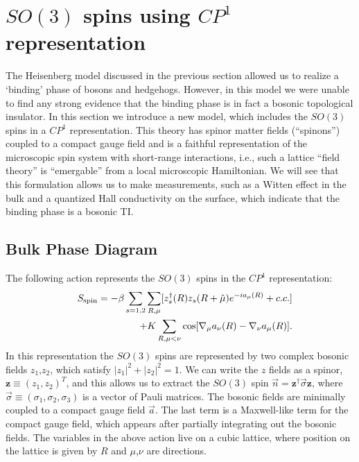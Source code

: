 \documentclass[prb,twocolumn]{revtex4-1}
\newcommand{\cp}{$CP^1$ }
\begin{document}

\section{$SO(3)$ spins using $CP^1$ representation}
\label{section::CP1}

The Heisenberg model discussed in the previous section allowed us to realize a `binding' phase of bosons and hedgehogs. However, in this model we were unable to find any strong evidence that the binding phase is in fact a bosonic topological insulator. In this section we introduce a new model, which includes the $SO(3)$ spins in a \cp representation. 
This theory has spinor matter fields (``spinons'') coupled to a compact gauge field and is a faithful representation of the microscopic spin system with short-range interactions, i.e., such a lattice ``field theory'' is ``emergable'' from a local microscopic Hamiltonian. We will see that this formulation allows us to make measurements, such as a Witten effect in the bulk and a quantized Hall conductivity on the surface, which indicate that the binding phase is a bosonic TI.

\subsection{Bulk Phase Diagram}
The following action represents the $SO(3)$ spins in the $CP^1$ representation:
\begin{eqnarray}
&&S_{\rm spin}=-\beta\sum_{s=1,2}\sum_{R,\mu} [z_s^\dagger(R)z_s(R+\hat\mu)e^{-ia_\mu(R)}+c.c.] \nonumber\\
&&+K\sum_{R,\mu<\nu} \cos[\nabla_\mu a_\nu(R)-\nabla_\nu a_\mu(R)].
\label{cp1action}
\end{eqnarray} 
In this representation the $SO(3)$ spins are represented by two complex bosonic fields $z_1$,$z_2$, which satisfy $|z_1|^2+|z_2|^2=1$. We can write the $z$ fields as a spinor, $\mathbf{z}\equiv(z_1,z_2)^T$, and this allows us to extract the $SO(3)$ spin $\vec{n}=\mathbf{z^\dagger} \vec\sigma \mathbf{z}$, where $\vec{\sigma}\equiv (\sigma_1,\sigma_2,\sigma_3)$ is a vector of Pauli matrices.
The bosonic fields are minimally coupled to a compact gauge field $\vec{a}$. The last term is a Maxwell-like term for the compact gauge field, which appears after partially integrating out the bosonic fields. The variables in the above action live on a cubic lattice, where position on the lattice is given by $R$ and $\mu$,$\nu$ are directions.
\end{document}
